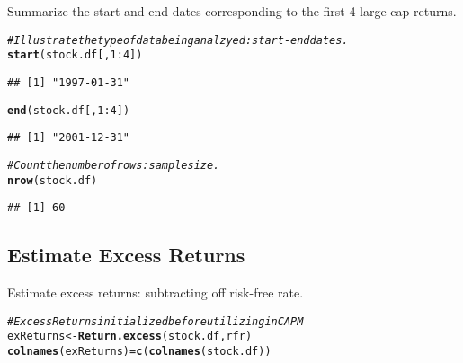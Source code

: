 \documentclass[a4paper]{article}\usepackage[]{graphicx}\usepackage[]{color}
\makeatletter
\newcommand{\hlnum}[1]{\textcolor[rgb]{0.686,0.059,0.569}{#1}}%
\newcommand{\hlcom}[1]{\textcolor[rgb]{0.678,0.584,0.686}{\textit{#1}}}%
\newcommand{\hlopt}[1]{\textcolor[rgb]{0,0,0}{#1}}%
\newcommand{\hlstd}[1]{\textcolor[rgb]{0.345,0.345,0.345}{#1}}%
\newcommand{\hlkwb}[1]{\textcolor[rgb]{0.69,0.353,0.396}{#1}}%
\newcommand{\hlkwd}[1]{\textcolor[rgb]{0.737,0.353,0.396}{\textbf{#1}}}%
\newenvironment{kframe}{%
 \def\at@end@of@kframe{}%
 \ifinner\ifhmode%
  \def\at@end@of@kframe{\end{minipage}}%
  \begin{minipage}{\columnwidth}%
 \fi\fi%
 \def\FrameCommand##1{\hskip\@totalleftmargin \hskip-\fboxsep
 \colorbox{shadecolor}{##1}\hskip-\fboxsep
     \hskip-\linewidth \hskip-\@totalleftmargin \hskip\columnwidth}%
 \MakeFramed {\advance\hsize-\width
   \@totalleftmargin\z@ \linewidth\hsize
   \@setminipage}}%
 {\par\unskip\endMakeFramed%
 \at@end@of@kframe}
\newenvironment{knitrout}{}{} %
\makeatother
\begin{document}
Summarize the start and end dates corresponding to the first 4 large cap returns.
\begin{knitrout}
\color{fgcolor}\begin{kframe}
\begin{alltt}
\hlcom{# Illustrate the type of data being analzyed: start-end dates.}
\hlkwd{start}\hlstd{(stock.df[,} \hlnum{1}\hlopt{:}\hlnum{4}\hlstd{])}
\end{alltt}
\begin{verbatim}
## [1] "1997-01-31"
\end{verbatim}
\begin{alltt}
\hlkwd{end}\hlstd{(stock.df[,} \hlnum{1}\hlopt{:}\hlnum{4}\hlstd{])}
\end{alltt}
\begin{verbatim}
## [1] "2001-12-31"
\end{verbatim}
\begin{alltt}
\hlcom{# Count the number of rows: sample size.}
\hlkwd{nrow}\hlstd{(stock.df)}
\end{alltt}
\begin{verbatim}
## [1] 60
\end{verbatim}
\end{kframe}
\end{knitrout}

\subsection{Estimate Excess Returns}
Estimate excess returns: subtracting off risk-free rate.
\begin{knitrout}
\color{fgcolor}\begin{kframe}
\begin{alltt}
\hlcom{# Excess Returns initialized before utilizing in CAPM}
\hlstd{exReturns} \hlkwb{<-} \hlkwd{Return.excess}\hlstd{(stock.df, rfr)}
\hlkwd{colnames}\hlstd{(exReturns)} \hlkwb{=} \hlkwd{c}\hlstd{(}\hlkwd{colnames}\hlstd{(stock.df))}
\end{alltt}
\end{kframe}
\end{knitrout}
\end{document}
